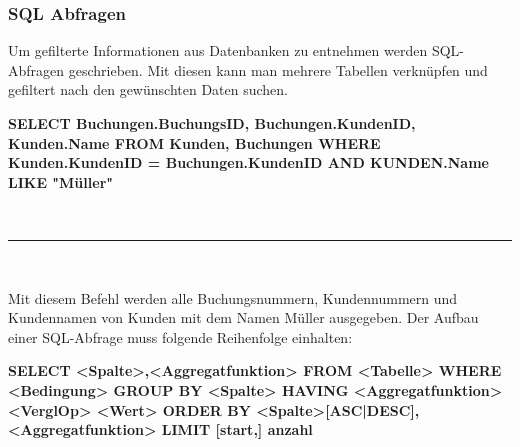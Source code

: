 \documentclass[12pt,a4paper]{article}
\begin{document}
\subsubsection{SQL Abfragen}
    \begin{minipage}{.4\textwidth}
        Um gefilterte Informationen aus Datenbanken zu entnehmen werden SQL-Abfragen geschrieben. Mit diesen kann man mehrere Tabellen verknüpfen und gefiltert nach den gewünschten Daten suchen.
    \end{minipage}
    \hspace{1cm}
    \begin{minipage}{.5\textwidth}
        \textbf{SELECT Buchungen.BuchungsID, Buchungen.KundenID,\newline
        Kunden.Name FROM Kunden, Buchungen\newline
        WHERE Kunden.KundenID = Buchungen.KundenID\newline
        AND KUNDEN.Name LIKE "Müller"}
    \end{minipage}\newline
    \textcolor{white}{Platzhalter}\newline
    \noindent\rule{\textwidth}{1pt}
    \textcolor{white}{Platzhalter}\newline
    \begin{minipage}{.4\textwidth}
        Mit diesem Befehl werden alle Buchungsnummern, Kundennummern und 
        Kundennamen von Kunden mit dem Namen Müller ausgegeben.\newline
        Der Aufbau einer SQL-Abfrage muss folgende Reihenfolge einhalten:
    \end{minipage}
    \hspace{1cm}
    \begin{minipage}{.5\textwidth}
        \textbf{SELECT <Spalte>,<Aggregatfunktion>\newline
        FROM <Tabelle>\newline
        WHERE <Bedingung>\newline
        GROUP BY <Spalte>\newline
        HAVING <Aggregatfunktion> <VerglOp> <Wert>\newline
        ORDER BY <Spalte>[ASC|DESC], <Aggregatfunktion>\newline
        LIMIT [start,] anzahl}
    \end{minipage}\newline
\end{document}
